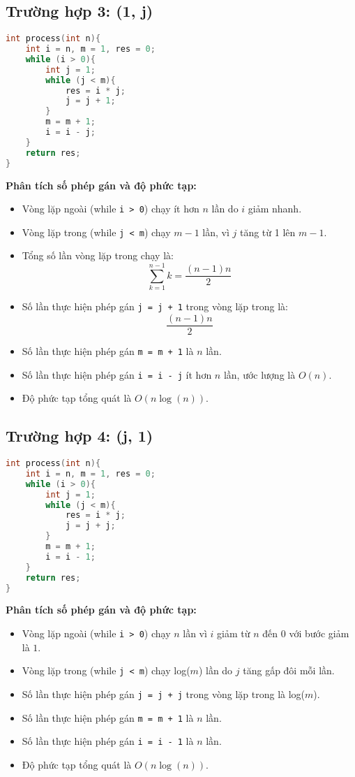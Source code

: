 \documentclass[12pt,a4paper]{article}
\begin{document}
\subsection*{Trường hợp 3: (1, j)}
\begin{lstlisting}[language=C++]
int process(int n){
    int i = n, m = 1, res = 0;
    while (i > 0){
        int j = 1;
        while (j < m){
            res = i * j;
            j = j + 1;
        }
        m = m + 1;
        i = i - j;
    }
    return res;
}
\end{lstlisting}

\textbf{Phân tích số phép gán và độ phức tạp:}
\begin{itemize}
    \item Vòng lặp ngoài (while \texttt{i > 0}) chạy ít hơn $n$ lần do $i$ giảm nhanh.
    \item Vòng lặp trong (while \texttt{j < m}) chạy $m-1$ lần, vì $j$ tăng từ 1 lên $m-1$.
    \item Tổng số lần vòng lặp trong chạy là:
    \[
    \sum_{k=1}^{n-1} k = \frac{(n-1)n}{2}
    \]
    \item Số lần thực hiện phép gán \texttt{j = j + 1} trong vòng lặp trong là:
    \[
    \frac{(n-1)n}{2}
    \]
    \item Số lần thực hiện phép gán \texttt{m = m + 1} là $n$ lần.
    \item Số lần thực hiện phép gán \texttt{i = i - j} ít hơn $n$ lần, ước lượng là $O(n)$.
    \item Độ phức tạp tổng quát là $O(n \log(n))$.
\end{itemize}

\subsection*{Trường hợp 4: (j, 1)}
\begin{lstlisting}[language=C++]
int process(int n){
    int i = n, m = 1, res = 0;
    while (i > 0){
        int j = 1;
        while (j < m){
            res = i * j;
            j = j + j;
        }
        m = m + 1;
        i = i - 1;
    }
    return res;
}
\end{lstlisting}

\textbf{Phân tích số phép gán và độ phức tạp:}
\begin{itemize}
    \item Vòng lặp ngoài (while \texttt{i > 0}) chạy $n$ lần vì $i$ giảm từ $n$ đến $0$ với bước giảm là $1$.
    \item Vòng lặp trong (while \texttt{j < m}) chạy log($m$) lần do $j$ tăng gấp đôi mỗi lần.
    \item Số lần thực hiện phép gán \texttt{j = j + j} trong vòng lặp trong là log($m$).
    \item Số lần thực hiện phép gán \texttt{m = m + 1} là $n$ lần.
    \item Số lần thực hiện phép gán \texttt{i = i - 1} là $n$ lần.
    \item Độ phức tạp tổng quát là $O(n \log(n))$.
\end{itemize}
\end{document}
